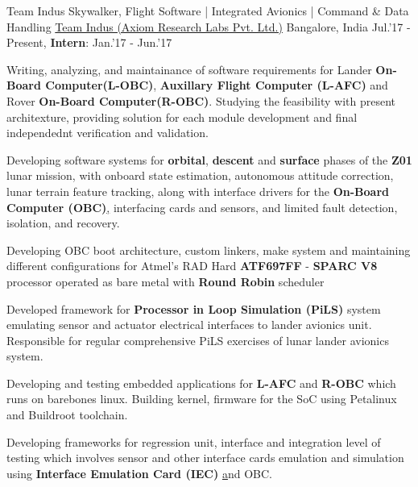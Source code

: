 \begin{cventries}
	\cventry
	{Team Indus Skywalker, Flight Software | Integrated Avionics | Command \& Data Handling}
	{\href{http://www.teamindus.in/}{Team Indus (Axiom Research Labs Pvt. Ltd.)}}
	{Bangalore, India}
	{Jul.'17 - Present, \textbf{Intern}: Jan.'17 - Jun.'17}
	{
		\begin{cvitems}
		\item{Writing, analyzing, and maintainance of software requirements for Lander \textbf{On-Board Computer(L-OBC)}, \textbf{Auxillary Flight Computer (L-AFC)} and Rover \textbf{On-Board Computer(R-OBC)}. Studying the feasibility with present architexture, providing solution for each module development and final independednt verification and validation.}
		\item{Developing software systems for \textbf{orbital}, \textbf{descent} and \textbf{surface} phases of the \textbf{Z01} lunar mission, with onboard state estimation, autonomous attitude correction, lunar terrain feature tracking, along with interface drivers for the \textbf{On-Board Computer (OBC)}\href{http://ww1.microchip.com/downloads/en/DeviceDoc/ATF697FF.pdf}, interfacing cards and sensors, and limited fault detection, isolation, and recovery.}
			\item{Developing OBC boot architecture, custom linkers, make system and maintaining different configurations for Atmel's RAD Hard \textbf{ATF697FF} - \textbf{SPARC V8} processor operated as bare metal with \textbf{Round Robin} scheduler}
			\item{Developed framework for \textbf{Processor in Loop Simulation (PiLS)} system emulating sensor and actuator electrical interfaces to lander avionics unit. Responsible for regular comprehensive PiLS exercises of lunar lander avionics system.}
			\item{Developing and testing embedded applications for \textbf{L-AFC} and \textbf{R-OBC} which runs on barebones linux. Building kernel, firmware for the SoC using Petalinux and Buildroot toolchain.}
			\item{Developing frameworks for regression unit, interface and integration level of testing which involves sensor and other interface cards emulation and simulation using \textbf{Interface Emulation Card (IEC) }\href{http://zedboard.org/product/microzed/} and OBC.}
		\end{cvitems}
	}
\end{cventries}
